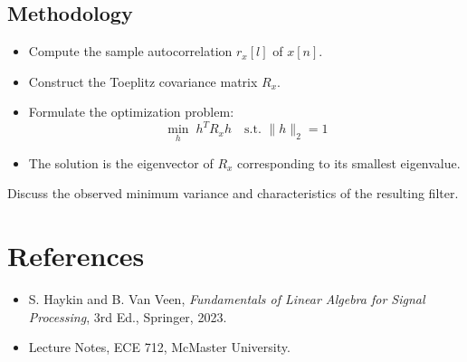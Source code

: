 \documentclass[12pt,a4paper]{article}
\begin{document}
\subsection{Methodology}
\begin{itemize}
    \item Compute the sample autocorrelation \( r_x[l] \) of \( x[n] \).
    \item Construct the Toeplitz covariance matrix \( R_x \).
    \item Formulate the optimization problem:
    \[
    \min_{h} \; h^T R_x h \quad \text{s.t. } \|h\|_2 = 1
    \]
    \item The solution is the eigenvector of $R_x$ corresponding to its smallest eigenvalue.
\end{itemize}


Discuss the observed minimum variance and characteristics of the resulting filter.

\newpage
\section*{References}
\begin{itemize}
    \item S. Haykin and B. Van Veen, \textit{Fundamentals of Linear Algebra for Signal Processing}, 3rd Ed., Springer, 2023.
    \item Lecture Notes, ECE 712, McMaster University.
\end{itemize}
\end{document}
